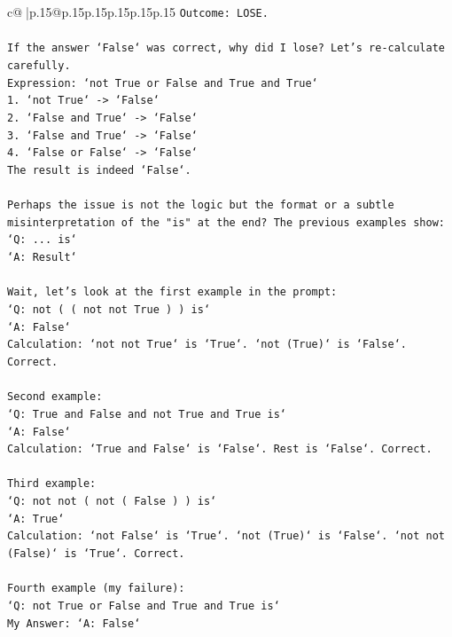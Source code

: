 \documentclass{article}
\begin{document}
{\begin{supertabular}{c@{$\;$}|p{.15\linewidth}@{}p{.15\linewidth}p{.15\linewidth}p{.15\linewidth}p{.15\linewidth}p{.15\linewidth}}
{{{\texttt{Outcome: LOSE.} \\
\\ 
\texttt{If the answer `False` was correct, why did I lose? Let's re{-}calculate carefully.} \\
\texttt{Expression: `not True or False and True and True`} \\
\texttt{1. `not True` {-}> `False`} \\
\texttt{2. `False and True` {-}> `False`} \\
\texttt{3. `False and True` {-}> `False`} \\
\texttt{4. `False or False` {-}> `False`} \\
\texttt{The result is indeed `False`.} \\
\\ 
\texttt{Perhaps the issue is not the logic but the format or a subtle misinterpretation of the "is" at the end? The previous examples show:} \\
\texttt{`Q: ... is`} \\
\texttt{`A: Result`} \\
\\ 
\texttt{Wait, let's look at the first example in the prompt:} \\
\texttt{`Q: not ( ( not not True ) ) is`} \\
\texttt{`A: False`} \\
\texttt{Calculation: `not not True` is `True`. `not (True)` is `False`. Correct.} \\
\\ 
\texttt{Second example:} \\
\texttt{`Q: True and False and not True and True is`} \\
\texttt{`A: False`} \\
\texttt{Calculation: `True and False` is `False`. Rest is `False`. Correct.} \\
\\ 
\texttt{Third example:} \\
\texttt{`Q: not not ( not ( False ) ) is`} \\
\texttt{`A: True`} \\
\texttt{Calculation: `not False` is `True`. `not (True)` is `False`. `not not (False)` is `True`. Correct.} \\
\\ 
\texttt{Fourth example (my failure):} \\
\texttt{`Q: not True or False and True and True is`} \\
\texttt{My Answer: `A: False`} \\
}}}
\end{supertabular}}
\end{document}
